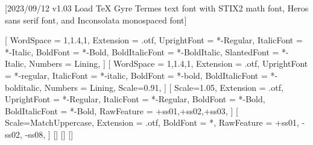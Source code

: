 
[2023/09/12 v1.03 Load TeX Gyre Termes text font with STIX2 math font, Heros sans serif font, and Inconsolata monospaced font]

%
%
\ifpdftex
	\RequirePackage[T1]{fontenc}	
	\RequirePackage{bm}
\else
    \RequirePackage[warnings-off={mathtools-colon,mathtools-overbracket}]{unicode-math}
    \setmainfont{TeXGyreTermesX}[%
		WordSpace = {1,1.4,1},%
    	Extension = .otf,
    	UprightFont = *-Regular,
    	ItalicFont = *-Italic,
    	BoldFont = *-Bold,
    	BoldItalicFont = *-BoldItalic,
		SlantedFont = *-Italic,
		Numbers = Lining,
	]
	\setsansfont{texgyreheros}[%
		WordSpace = {1,1.4,1},
		Extension = .otf,
    	UprightFont = *-regular,
    	ItalicFont = *-italic,
    	BoldFont = *-bold,
    	BoldItalicFont = *-bolditalic,
		Numbers = Lining,
    	Scale=0.91,%
	]        
	\setmonofont{Inconsolatazi4}[%
        Scale=1.05,%
        Extension = .otf,
        UprightFont = *-Regular,
        ItalicFont = *-Regular,%
        BoldFont = *-Bold, 
    	BoldItalicFont = *-Bold,%
        RawFeature = {+ss01,+ss02,+ss03},
    ]             
	[%
    	Scale=MatchUppercase,
    	Extension = .otf,
		BoldFont = *,%
    	RawFeature = {+ss01, -ss02, -ss08},
   ]
   \setmathfontface{}[]%
   \setmathfontface{}[]
   \setmathfontface{}[]%
   \newcommand*{\FRAC}[1]{{\addfontfeature{Fractions=On}#1}}%
\fi
